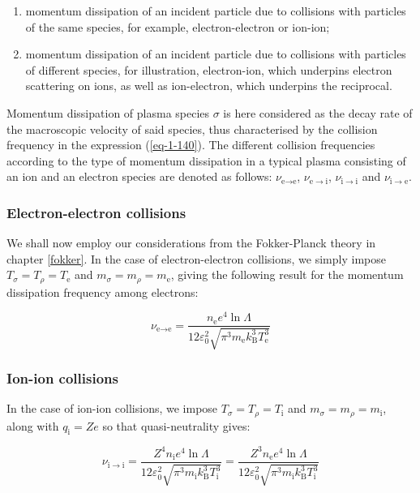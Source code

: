 \begin{enumerate}
    \item momentum dissipation of an incident particle due to collisions with particles of the same species, for example, electron-electron or ion-ion;
    \item momentum dissipation of an incident particle due to collisions with particles of different species, for illustration, electron-ion, which underpins electron scattering on ions, as well as ion-electron, which underpins the reciprocal.
\end{enumerate}

Momentum dissipation of plasma species $\sigma$ is here considered as the decay rate of the macroscopic velocity of said species, thus characterised by the collision frequency in the expression (\ref{eq-1-140}). The different collision frequencies according to the type of momentum dissipation in a typical plasma consisting of an ion and an electron species are denoted as follows: $\nu_{\text{e}\to\text{e}}$, $\nu_{\text{e}\to\mathrm{i}}$, $\nu_{\mathrm{i}\to\mathrm{i}}$ and $\nu_{\mathrm{i}\to\text{e}}$.

\subsubsection{Electron-electron collisions}

We shall now employ our considerations from the Fokker-Planck theory in chapter \ref{fokker}. In the case of electron-electron collisions, we simply impose $T_\sigma=T_\rho=T_\text{e}$ and $m_\sigma=m_\rho=m_\text{e}$, giving the following result for the momentum dissipation frequency among electrons:

\begin{equation}
    \nu_{\text{e}\to\text{e}}=\frac{n_\text{e}e^4\ln{\Lambda}}{12\varepsilon_0^2\sqrt{\pi^3m_\text{e}k_\mathrm{B}^3T_\text{e}^3}}
\end{equation}

\subsubsection{Ion-ion collisions}

In the case of ion-ion collisions, we impose $T_\sigma=T_\rho=T_\mathrm{i}$ and $m_\sigma=m_\rho=m_\mathrm{i}$, along with $q_\mathrm{i}=Ze$ so that quasi-neutrality gives:

\begin{equation}
    \nu_{\mathrm{i}\to\mathrm{i}}=\frac{Z^4n_\mathrm{i}e^4\ln{\Lambda}}{12\varepsilon_0^2\sqrt{\pi^3 m_\mathrm{i}k_\mathrm{B}^3T_\mathrm{i}^3}}=\frac{Z^3n_\text{e}e^4\ln{\Lambda}}{12\varepsilon_0^2\sqrt{\pi^3m_\mathrm{i}k_\mathrm{B}^3T_\mathrm{i}^3}}
\end{equation}

